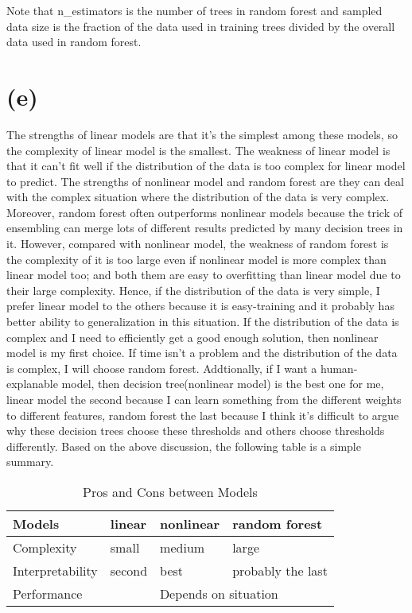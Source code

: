 \documentclass[12pt,a4paper]{article}
\begin{document}
Note that n\_estimators is the number of trees in random forest and sampled data size is the fraction of the data used in training trees divided by the overall data used in random forest.

\newpage
\section*{(e)}
The strengths of linear models are that it's the simplest among these models, so the complexity of linear model is the smallest. The weakness of linear model is that it can't 
fit well if the distribution of the data is too complex for linear model to predict. The strengths of nonlinear model and random forest are they can deal with the complex situation where
the distribution of the data is very complex. Moreover, random forest often outperforms nonlinear models because the trick of ensembling can merge lots of different results predicted by
many decision trees in it. However, compared with nonlinear model, the weakness of random forest is the complexity of it is too large even if nonlinear model is more complex than linear model too;
and both them are easy to overfitting than linear model due to their large complexity. Hence, if the distribution of the data is very simple, I prefer linear model to the others because it
is easy-training and it probably has better ability to generalization in this situation. If the distribution of the data is complex and I need to efficiently get a good enough solution, 
then nonlinear model is my first choice. If time isn't a problem and the distribution of the data is complex, I will choose random forest. Addtionally, if I want a human-explanable model,
then decision tree(nonlinear model) is the best one for me, linear model the second because I can learn something from the different weights to different features, random forest the last because
I think it's difficult to argue why these decision trees choose these thresholds and others choose thresholds differently. Based on the above discussion, the following table is a
simple summary.
\begin{table}[htbp]
    \centering
    \caption{Pros and Cons between Models}
    \label{label5}
    \begin{tabular}[t]{llll}
    \hline
    Models & linear & nonlinear & random forest\\
    \hline
    Complexity & small & medium & large \\
    Interpretability & second & best & probably the last \\
    Performance & \multicolumn{3}{c}{Depends on situation}\\
    \hline
    \end{tabular}
\end{table}
\end{document}
